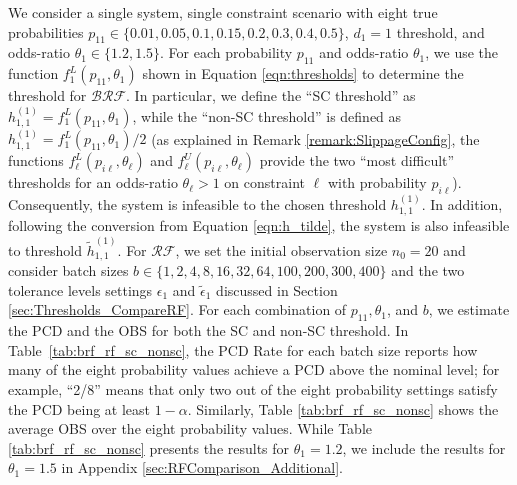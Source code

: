 \documentclass[11pt]{article}
\begin{document}
We consider a single system, single constraint scenario with eight true probabilities $p_{11}\in\{0.01, 0.05, 0.1, 0.15, 0.2, 0.3, 0.4, 0.5\}$, $d_1=1$ threshold, and odds-ratio $\theta_1\in \{1.2,1.5\}$. 
For each probability $p_{11}$ and odds-ratio $\theta_1$, we use the function $f^L_1(p_{11}, \theta_1)$ shown in Equation \eqref{eqn:thresholds} to determine the threshold for $\mathcal{BRF}$. In particular, we define the ``SC threshold'' as $h_{1,1}^{(1)}=f_{1}^{L}(p_{11}, \theta_1)$, while the ``non-SC threshold'' is defined as $h_{1,1}^{(1)}=f_{1}^{L}(p_{11}, \theta_1)/2$ (as explained in Remark \ref{remark:SlippageConfig}, the functions $f^L_\ell(p_{i\ell}, \theta_\ell)$ and $f^U_\ell(p_{i\ell}, \theta_\ell)$ provide the two ``most difficult'' thresholds for an odds-ratio $\theta_\ell>1$ on constraint $\ell$ with probability $p_{i\ell}$).
Consequently, the system is infeasible to the chosen threshold $h_{1,1}^{(1)}$. In addition, following the conversion from Equation \eqref{eqn:h_tilde}, the system is also infeasible to threshold $\tilde{h}_{1,1}^{(1)}$.
For $\mathcal{RF}$, we set the initial observation size $n_0=20$ and consider batch sizes $b\in\{1,2,4,8,16,32,64,100,200,300,400\}$ and the two tolerance levels settings $\epsilon_1$ and $\tilde{\epsilon}_1$ discussed in Section \ref{sec:Thresholds_CompareRF}. %
For each combination of $p_{11}, \theta_1$, and $b$, we estimate the PCD and the OBS for both the SC and non-SC threshold. 
In Table~\ref{tab:brf_rf_sc_nonsc}, the PCD Rate for each batch size reports how many of the eight probability values achieve a PCD above the nominal level; for example, ``2/8'' means that only two out of the eight probability settings satisfy the PCD being at least $1-\alpha$. Similarly, Table \ref{tab:brf_rf_sc_nonsc} shows the average OBS over the eight probability values. While Table \ref{tab:brf_rf_sc_nonsc} presents the results for $\theta_1=1.2$, we include the results for $\theta_1=1.5$ in Appendix \ref{sec:RFComparison_Additional}.
\end{document}
